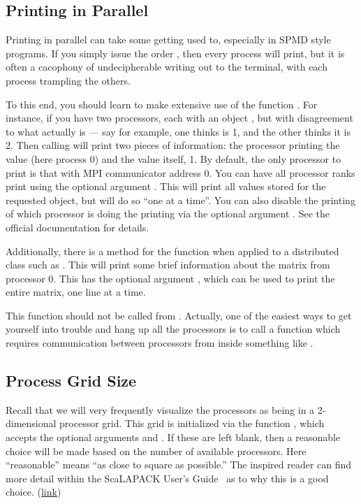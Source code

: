 \subsection{Printing in Parallel}

Printing in parallel can take some getting used to, especially in SPMD style programs.  If you simply issue the order , then every process will print, but it is often a cacophony of undecipherable writing out to the terminal, with each process trampling the others.  

To this end, you should learn to make extensive use of the  function .  For instance, if you have two processors, each with an object , but with disagreement to what  actually is --- say for example, one thinks  is 1, and the other thinks it is 2.  Then calling  will print two pieces of information:  the processor printing the value (here process 0) and the value itself, 1.  By default, the only processor to print is that with MPI communicator address 0.  You can have all processor ranks print using the optional argument .  This will print all values stored for the requested object, but will do so ``one at a time''.  You can also disable the printing of which processor is doing the printing via the optional argument .  See the official  documentation for details.

Additionally, there is a method for the  function when applied to a distributed class such as .  This will print some brief information about the matrix from processor 0.  This has the optional argument , which can be used to print the entire matrix, one line at a time.

This function should not be called from .  Actually, one of the easiest ways to get yourself into trouble and hang up all the processors is to call a function which requires communication between processors from inside something like .

\subsection{Process Grid Size}

Recall that we will very frequently visualize the processors as being in a 2-dimensional processor grid.  This grid is initialized via the function , which accepts the optional arguments  and .  If these are left blank, then a reasonable choice will be made based on the number of available processors.  Here ``reasonable'' means ``as close to square as possible.''  The inspired reader can find more detail within the ScaLAPACK User's Guide~\citep{slug} as to why this is a good choice. (\href{http://www.netlib.org/utk/papers/scalapack/node20.html}{link})


